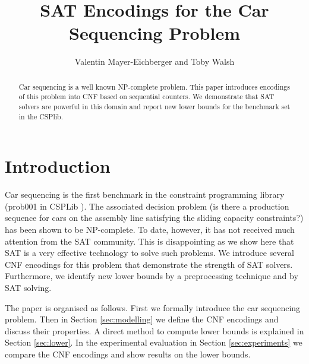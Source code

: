 \documentclass[]{llncs}
\author{Valentin Mayer-Eichberger and Toby Walsh}
\institute{NICTA and University of New South Wales \\
Locked Bag 6016, Sydney NSW 1466, Australia 
\email{\{valentin.mayer-eichberger,toby.walsh\}@nicta.com.au}
}
\title{SAT Encodings for the Car Sequencing Problem}
\begin{document}
 

\maketitle

\begin{abstract} 
    Car sequencing is a well known NP-complete problem. This paper introduces encodings of this problem into CNF based
    on sequential counters. We demonstrate that SAT solvers are powerful in this domain and report new lower bounds for
    the benchmark set in the CSPlib.
\end{abstract}

\section{Introduction}

Car sequencing is the first benchmark in the constraint programming library (prob001 in CSPLib \cite{Gent99}). The
associated decision problem (is there a production sequence for cars on the assembly line satisfying the sliding
capacity constraints?) has been shown to be NP-complete.  To date, however, it has not received much attention from the
SAT community.  This is disappointing as we show here that SAT is a very effective technology to solve such problems. We
introduce several CNF encodings for this problem that demonstrate the strength of SAT solvers. Furthermore, we identify
new lower bounds by a preprocessing technique and by SAT solving.

The paper is organised as follows. First we formally introduce the car sequencing problem. Then in Section
\ref{sec:modelling} we define the CNF encodings and discuss their properties. A direct method to compute lower bounds is
explained in Section \ref{sec:lower}. In the experimental evaluation in Section \ref{sec:experiments} we compare the CNF
encodings and show results on the lower bounds. 
\end{document}
